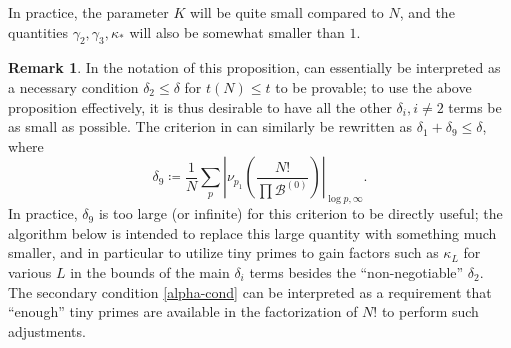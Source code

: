 \documentclass[10pt,a4paper,reqno]{amsart}
\numberwithin{equation}{section}
\theoremstyle{plain}
\theoremstyle{definition}
\newtheorem{remark}[remark]{Remark}
\newcommand\tuple{{\mathcal B}}
\begin{document}
In practice, the parameter $K$ will be quite small compared to $N$, and the quantities $\gamma_2, \gamma_3, \kappa_{*}$ will also be somewhat smaller than $1$.

\begin{remark} In the notation of this proposition,  can essentially be interpreted as a necessary condition $\delta_2 \leq \delta$ for $t(N) \leq t$ to be provable; to use the above proposition effectively, it is thus desirable to have all the other $\delta_i, i \neq 2$ terms be as small as possible.  The criterion in  can similarly be rewritten as $\delta_1+\delta_9 \leq \delta$, where
  $$ \delta_9 \coloneqq \frac{1}{N} \sum_p \left|\nu_{p_1}\left( \frac{N!}{\prod \tuple^{(0)}} \right)\right|_{\log p, \infty}.$$
In practice, $\delta_9$ is too large (or infinite) for this criterion to be directly useful; the algorithm below is intended to replace this large quantity with something much smaller, and in particular to utilize tiny primes to gain factors such as $\kappa_L$ for various $L$ in the bounds of the main $\delta_i$ terms besides the ``non-negotiable'' $\delta_2$.  The secondary condition \eqref{alpha-cond} can be interpreted as a requirement that ``enough'' tiny primes are available in the factorization of $N!$ to perform such adjustments.
\end{remark}
\end{document}
